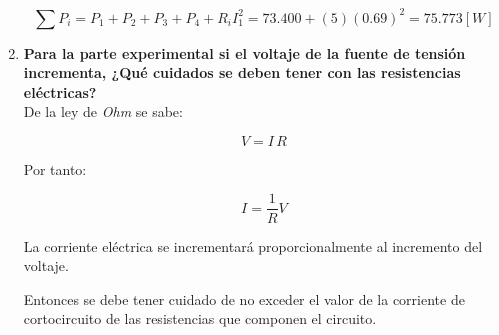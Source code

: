 \documentclass[letter,11pt]{article}
\begin{document}
\begin{enumerate}
\begin{equation*}
    \sum P_i = P_1 + P_2 + P_3 + P_4 + R_i I^2_1
             = 73.400 + (5)(0.69)^2 = 75.773 [W]
\end{equation*}

\item \textbf{Para la parte experimental si el voltaje de la fuente de tensión
    incrementa, ¿Qué cuidados se deben tener con las resistencias
    eléctricas?} \\

De la ley de \emph{Ohm} se sabe:

\begin{equation*}
    V = I\, R
\end{equation*}

Por tanto:

\begin{equation*}
    I = \frac{1}{R} V
\end{equation*}

La corriente eléctrica se incrementará proporcionalmente al incremento del
voltaje.

Entonces se debe tener cuidado de no exceder el valor de la corriente de
cortocircuito de las resistencias que componen el circuito.

\end{enumerate}
 
\end{document}
